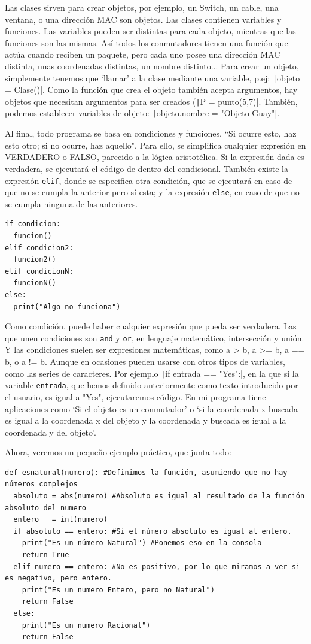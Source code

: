 \documentclass[a4paper, 11pt]{report} %
\begin{document}
Las clases sirven para crear objetos, por ejemplo, un Switch, un cable, una ventana, o una dirección MAC son objetos. Las clases contienen variables y funciones. Las variables pueden ser distintas para cada objeto, mientras que las funciones son las mismas. Así todos los conmutadores tienen una función que actúa cuando reciben un paquete, pero cada uno posee una dirección MAC distinta, unas coordenadas distintas, un nombre distinto... Para crear un objeto, simplemente tenemos que `llamar' a la clase mediante una variable, p.ej: \texttt|objeto = Clase()|. Como la función que crea el objeto también acepta argumentos, hay objetos que necesitan argumentos para ser creados (\texttt|P = punto(5,7)|. También, podemos establecer variables de objeto: \texttt|objeto.nombre = "Objeto Guay"|.

Al final, todo programa se basa en condiciones y funciones. ``Si ocurre esto, haz esto otro; si no ocurre, haz aquello". Para ello, se simplifica cualquier expresión en VERDADERO o FALSO, parecido a la lógica aristotélica. Si la expresión dada es verdadera, se ejecutará el código de dentro del condicional. También existe la expresión \texttt{elif}, donde se especifica otra condición, que se ejecutará en caso de que no se cumpla la anterior pero sí esta; y la expresión \texttt{else}, en caso de que no se cumpla ninguna de las anteriores.

\newpage
\begin{verbatim}
if condicion:
  funcion()
elif condicion2:
  funcion2()
elif condicionN:
  funcionN()
else:
  print("Algo no funciona")
\end{verbatim}
Como condición, puede haber cualquier expresión que pueda ser verdadera. Las que unen condiciones son \texttt{and} y \texttt{or}, en lenguaje matemático, intersección y unión. Y las condiciones suelen ser expresiones matemáticas, como a > b, a >= b, a == b, o a != b. Aunque en ocasiones pueden usarse con otros tipos de variables, como las series de caracteres. Por ejemplo \texttt|if entrada == "Yes":|, en la que si la variable \texttt{entrada}, que hemos definido anteriormente como texto introducido por el usuario, es igual a "Yes", ejecutaremos código. En mi programa tiene aplicaciones como `Si el objeto es un conmutador' o `si la coordenada x buscada es igual a la coordenada x del objeto y la coordenada y buscada es igual a la coordenada y del objeto'.

Ahora, veremos un pequeño ejemplo práctico, que junta todo:
\begin{verbatim}
def esnatural(numero): #Definimos la función, asumiendo que no hay números complejos
  absoluto = abs(numero) #Absoluto es igual al resultado de la función absoluto del numero
  entero   = int(numero) 
  if absoluto == entero: #Si el número absoluto es igual al entero.
    print("Es un número Natural") #Ponemos eso en la consola
    return True
  elif numero == entero: #No es positivo, por lo que miramos a ver si es negativo, pero entero.
    print("Es un numero Entero, pero no Natural")
    return False
  else:
    print("Es un numero Racional")
    return False
\end{verbatim}
\end{document}
